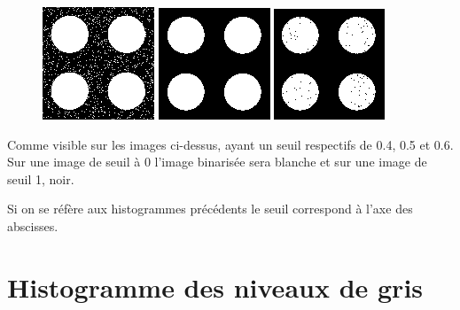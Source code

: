 \documentclass[a4paper,12pt]{report}
\begin{document}
\begin{figure}[!ht]
	\center
	\includegraphics[scale=0.5]{image/04.png}
	\includegraphics[scale=0.5]{image/05.png}
	\includegraphics[scale=0.5]{image/06.png}
\end{figure}

Comme visible sur les images ci-dessus, ayant un seuil respectifs de 0.4, 0.5 et 0.6. Sur une image de seuil à 0 l'image binarisée sera blanche et sur une image de seuil 1, noir.

Si on se réfère aux histogrammes précédents le seuil correspond à l'axe des abscisses.

\newpage

\section*{Histogramme des niveaux de gris}
\end{document}
